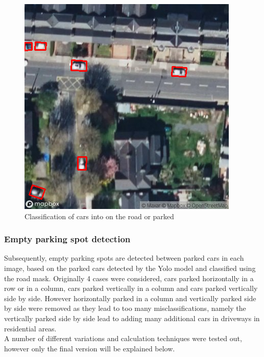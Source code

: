 \begin{figure}[htbp]
\begin{minipage}{0.45\textwidth}
    \end{minipage}
    \hfill
    \begin{minipage}{0.45\textwidth}
        \centering
        \includegraphics[width=\textwidth]{images/road_mask_classification3.png}
    \end{minipage}
    \caption{Classification of cars into on the road or parked}
    \label{fig:Road_mask_classification}
\end{figure}

\newpage

\subsubsection{Empty parking spot detection}
Subsequently, empty parking spots are detected between parked cars in each image, based on the parked cars detected by the Yolo model and classified using the road mask.
Originally 4 cases were considered, cars parked horizontally in a row or in a column, cars parked vertically in a column and cars parked vertically side by side. However horizontally parked in a column and vertically parked side by side were removed as they lead to too many misclassifications, namely the vertically parked side by side lead to adding many additional cars in driveways in residential areas.\\
A number of different variations and calculation techniques were tested out, however only the final version will be explained below.

